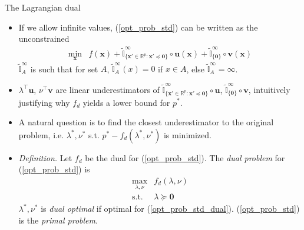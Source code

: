 \documentclass{beamer}
\numberwithin{equation}{section}
\newcommand{\aref}[1]{\alert{\ref{#1}}}
\begin{document}
\begin{frame}{The Lagrangian dual}
    \begin{itemize}
        \item
        If we allow infinite values, (\aref{opt_prob_std}) can be written as
        the unconstrained
        \begin{equation*}
            \begin{array}{ll}
                \displaystyle\min_\mathbf{x} &
                \displaystyle f(\mathbf{x}) + \tilde{\mathbb{I}}^\infty_{\{
                    \mathbf{x}' \in \mathbb{R}^p : \mathbf{x}' \preceq
                    \mathbf{0}
                \}}\circ\mathbf{u}(\mathbf{x}) +
                \tilde{\mathbb{I}}^\infty_{\{\mathbf{0}\}} \circ
                \mathbf{v}(\mathbf{x})
            \end{array}
        \end{equation*}
        $ \displaystyle\tilde{\mathbb{I}}_A^\infty $  is such that for set
        $ A $, $ \displaystyle\tilde{\mathbb{I}}_A^\infty(x) = 0 $ if
        $ x \in A $, else
        $ \displaystyle\tilde{\mathbb{I}}_A^\infty = \infty $.

        \item
        $ \lambda^\top\mathbf{u} $, $ \nu^\top\mathbf{v} $ are linear
        underestimators of $ \displaystyle\tilde{\mathbb{I}}^\infty_{\{
            \mathbf{x}' \in \mathbb{R}^p : \mathbf{x}' \preceq \mathbf{0}
        \}}\circ\mathbf{u} $, $ \displaystyle
        \tilde{\mathbb{I}}^\infty_{\{\mathbf{0}\}}\circ\mathbf{v} $,
        intuitively justifying why $ f_d $ yields a lower bound for $ p^* $.

        \item
        A natural question is to find the closest underestimator to the
        original problem, i.e. $ \lambda^*, \nu^* $ s.t.
        $ p^* - f_d(\lambda^*, \nu^*) $ is minimized.

        \item
        \textit{Definition.} Let $ f_d $ be the dual for
        (\aref{opt_prob_std}). The \textit{dual problem} for
        (\aref{opt_prob_std}) is
        \begin{equation} \label{opt_prob_std_dual}
            \begin{array}{ll}
                \displaystyle\max_{\lambda, \nu}& f_d(\lambda, \nu) \\
                \text{s.t.} & \lambda\succeq \mathbf{0}
            \end{array}
        \end{equation}
        $ \lambda^*, \nu^* $ is \textit{dual optimal} if optimal for
        (\aref{opt_prob_std_dual}). (\aref{opt_prob_std}) is the
        \textit{primal problem}.
    \end{itemize}

    \bigskip
\end{frame}
\end{document}
